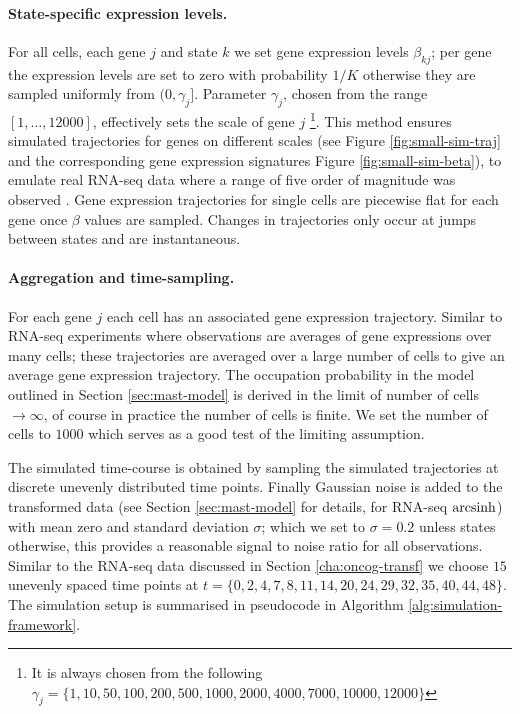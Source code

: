 \paragraph{State-specific expression levels.}
\label{sec:state-spec-expr}
For all cells, each gene $j$ and state $k$ we set gene expression levels $\beta_{kj}$; per gene the expression levels are set to zero with probability $1/K$ otherwise they are sampled uniformly from $(0, \gamma_j]$. Parameter $\gamma_j$, chosen from the range $[1, \ldots, 12000]$, effectively sets the scale of gene $j$ \footnote{It is always chosen from the following $\gamma_j = \lbrace 1, 10, 50, 100, 200, 500, 1000, 2000, 4000, 7000, 10000, 12000 \rbrace$}. This method ensures simulated trajectories for genes on different scales (see Figure \ref{fig:small-sim-traj} and the corresponding gene expression signatures Figure \ref{fig:small-sim-beta}), to emulate real RNA-seq data  where a range of five order of magnitude was observed \citep{Wang:2009ur,Mortazavi:2008jj}. Gene expression trajectories for single cells are piecewise flat for each gene once $\beta$ values are sampled. Changes in trajectories only occur at jumps between states and are instantaneous.

\paragraph{Aggregation and time-sampling.}
\label{sec:aggr-time-sampl}
For each gene $j$ each cell has an associated gene expression trajectory. Similar to RNA-seq experiments where observations are averages of gene expressions over many cells; these trajectories are averaged over a large number of cells to give an average gene expression trajectory. The occupation probability in the model outlined in Section \ref{sec:mast-model} is derived in the limit of number of cells $\rightarrow \infty$, of course in practice the number of cells is finite. We set the number of cells to $1000$ which serves as a good test of the limiting assumption.

The simulated time-course is obtained by sampling the simulated trajectories at discrete unevenly distributed time points. Finally Gaussian noise is added to the transformed data (see Section \ref{sec:mast-model} for details, for RNA-seq $\operatorname{arcsinh}$) with mean zero and standard deviation $\sigma$; which we set to $\sigma=0.2$ unless states otherwise, this provides a reasonable signal to noise ratio for all observations. Similar to the RNA-seq data discussed in Section \ref{cha:oncog-transf} we choose $15$ unevenly spaced  time points at $t=\lbrace 0,  2,  4,  7,  8, 11, 14, 20, 24, 29, 32, 35, 40, 44, 48\rbrace$. The simulation setup is summarised in pseudocode in Algorithm \ref{alg:simulation-framework}. 


